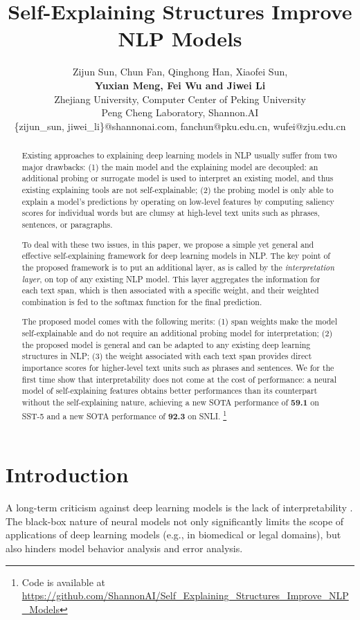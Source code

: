 \documentclass[11pt,a4paper]{article}
\title{Self-Explaining Structures Improve NLP Models}
\date{}
\author{
Zijun Sun, Chun Fan, Qinghong Han, Xiaofei Sun, \\ 
{\bf Yuxian Meng, Fei Wu and Jiwei Li }\\
  Zhejiang University,
  Computer Center of Peking University \\
  Peng Cheng Laboratory,  
   Shannon.AI\\
  \{zijun\_sun, jiwei\_li\}@shannonai.com,
  fanchun@pku.edu.cn,
  wufei@zju.edu.cn
}
\begin{document}
\maketitle

\begin{abstract}
Existing approaches to explaining deep learning models in NLP usually suffer from two major drawbacks:
(1) the main model and the explaining model are decoupled: 
an additional probing or surrogate model is used to  interpret an existing model, and  thus 
existing explaining tools
 are not self-explainable; (2) the probing model is only able to explain a model's predictions by operating on 
 low-level features  
by computing  saliency scores for individual words 
but  are clumsy  at  high-level text units such as phrases, sentences, or paragraphs. 


To deal with these two issues, in this paper, we propose a 
simple yet general and effective 
self-explaining framework  for deep learning models in NLP. 
The key point of the proposed framework is to put an additional layer, as is called by the {\it interpretation layer},  on top of any existing NLP model.  
This layer aggregates the information for each text span, which is then associated with a specific weight, and their weighted combination is fed to the softmax function for the final prediction. 

The proposed model comes with the following merits: 
(1) span weights make the model  self-explainable and do not require an additional probing model for interpretation; 
(2) the proposed model
 is general and can be adapted to any existing deep learning structures in NLP; 
(3) the weight associated with each text span 
 provides direct importance 
  scores for higher-level text units such as phrases and sentences.
We for the first time show that interpretability does not come at the cost of performance: 
a neural model of self-explaining features obtains better performances than its counterpart without the 
self-explaining nature, 
 achieving a new SOTA performance of {\bf 59.1} on SST-5 and 
  a new SOTA performance of {\bf 92.3} 
 on SNLI. \footnote{Code is available at \url{https://github.com/ShannonAI/Self_Explaining_Structures_Improve_NLP_Models}}
\end{abstract}




\section{Introduction} 
A long-term criticism against deep learning models is the lack of interpretability \cite{simonyan2013deep,bach2015lrp,montavon2017explaining,kindermans2017learning}. 
The black-box nature of neural models not only significantly limits the scope of applications of deep learning models (e.g., in  biomedical or legal domains), 
but also hinders model behavior analysis and error analysis. 
\end{document}
